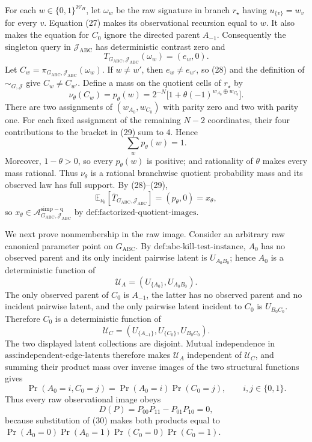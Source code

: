 For each \(w\in\{0,1\}^{\mathcal W_H}\), let \(\omega_w\) be the raw signature in branch \(r_\star\) having \(u_{\{v\}}=w_v\) for every \(v\).  Equation (27) makes its observational recursion equal to \(w\).  It also makes the equation for \(C_0\) ignore the directed parent \(A_{-1}\).  Consequently the singleton query in \(\mathcal J_{\mathrm{ABC}}\) has deterministic contrast zero and
\[
T_{G_{\mathrm{ABC}},\mathcal J_{\mathrm{ABC}}}(\omega_w)=(e_w,0).
\tag{28}
\]
Let \(C_w=\pi_{G_{\mathrm{ABC}},\mathcal J_{\mathrm{ABC}}}(\omega_w)\).  If \(w\ne w'\), then \(e_w\ne e_{w'}\), so (28) and the definition of \(\sim_{G,\mathcal J}\) give \(C_w\ne C_{w'}\).  Define a mass on the quotient cells of \(r_\star\) by
\[
\nu_\theta(C_w)=p_\theta(w)
=2^{-N}\bigl[1+\theta(-1)^{w_{A_0}\oplus w_{C_0}}\bigr].
\tag{29}
\]
There are two assignments of \((w_{A_0},w_{C_0})\) with parity zero and two with parity one.  For each fixed assignment of the remaining \(N-2\) coordinates, their four contributions to the bracket in (29) sum to \(4\).  Hence
\[
\sum_w p_\theta(w)=1.
\]
Moreover, \(1-\theta>0\), so every \(p_\theta(w)\) is positive; and rationality of \(\theta\) makes every mass rational.  Thus \(\nu_\theta\) is a rational branchwise quotient probability mass and its observed law has full support.  By (28)--(29),
\[
\mathbb E_{\nu_\theta}[\overline T_{G_{\mathrm{ABC}},\mathcal J_{\mathrm{ABC}}}]
=(p_\theta,0)=x_\theta,
\]
so \(x_\theta\in\mathcal A_{G_{\mathrm{ABC}},\mathcal J_{\mathrm{ABC}}}^{\mathrm{simp-q}}\) by \(\text{def:factorized-quotient-images}\).

We next prove nonmembership in the raw image.  Consider an arbitrary raw canonical parameter point on \(G_{\mathrm{ABC}}\).  By \(\text{def:abc-kill-test-instance}\), \(A_0\) has no observed parent and its only incident pairwise latent is \(U_{A_0B_0}\); hence \(A_0\) is a deterministic function of
\[
\mathcal U_A=(U_{\{A_0\}},U_{A_0B_0}).
\]
The only observed parent of \(C_0\) is \(A_{-1}\), the latter has no observed parent and no incident pairwise latent, and the only pairwise latent incident to \(C_0\) is \(U_{B_0C_0}\).  Therefore \(C_0\) is a deterministic function of
\[
\mathcal U_C=(U_{\{A_{-1}\}},U_{\{C_0\}},U_{B_0C_0}).
\]
The two displayed latent collections are disjoint.  Mutual independence in \(\text{ass:independent-edge-latents}\) therefore makes \(\mathcal U_A\) independent of \(\mathcal U_C\), and summing their product mass over inverse images of the two structural functions gives
\[
\Pr(A_0=i,C_0=j)=\Pr(A_0=i)\Pr(C_0=j),
\qquad i,j\in\{0,1\}.
\tag{30}
\]
Thus every raw observational image obeys
\[
D(P)=P_{00}P_{11}-P_{01}P_{10}=0,
\tag{31}
\]
because substitution of (30) makes both products equal to
\(\Pr(A_0=0)\Pr(A_0=1)\Pr(C_0=0)\Pr(C_0=1)\).

